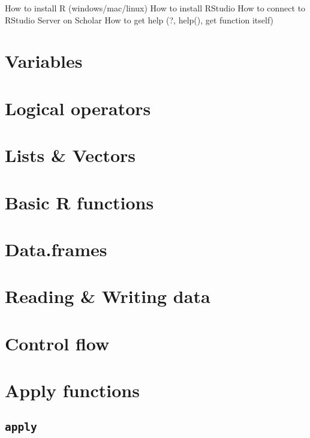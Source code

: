 \documentclass[
]{book}
\begin{document}
How to install R (windows/mac/linux)
How to install RStudio
How to connect to RStudio Server on Scholar
How to get help (?, help(), get function itself)

\hypertarget{r-variables}{%
\section{Variables}\label{r-variables}}

\hypertarget{r-logical-operators}{%
\section{Logical operators}\label{r-logical-operators}}

\hypertarget{r-lists-and-vectors}{%
\section{Lists \& Vectors}\label{r-lists-and-vectors}}

\hypertarget{r-basic-functions}{%
\section{Basic R functions}\label{r-basic-functions}}

\hypertarget{r-data-frames}{%
\section{Data.frames}\label{r-data-frames}}

\hypertarget{r-reading-and-writing-data}{%
\section{Reading \& Writing data}\label{r-reading-and-writing-data}}

\hypertarget{r-control-flow}{%
\section{Control flow}\label{r-control-flow}}

\hypertarget{r-apply-functions}{%
\section{Apply functions}\label{r-apply-functions}}

\hypertarget{r-apply}{%
\subsection{\texorpdfstring{\texttt{apply}}{apply}}\label{r-apply}}
\end{document}
